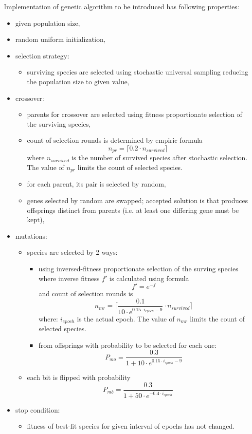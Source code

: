 \documentclass[a4paper]{IEEEtran}
\begin{document}
Implementation of genetic algorithm to be introduced has following properties:
\begin{itemize}
	\item given population size,
	\item random uniform initialization,
	\item selection strategy:
	\begin{itemize}
		\item surviving species are selected using stochastic universal 
		sampling reducing 
		the population size to given value,
	\end{itemize}
	\item crossover:
	\begin{itemize}
		\item parents for crossover are selected using fitness proportionate
		selection of the surviving species,
		\item count of selection rounds is determined by empiric formula
		\[ n_{pr} = \lceil 0.2\cdot n_{survived} \rceil \] 		
		where $ n_{survived} $ is the number of survived species after stochastic selection.
		The value of $ n_{pr} $ limits the count of selected species.
		\item for each parent, its pair is selected by random,
		\item genes selected by random are swapped; accepted solution is that 
		produces  offsprings distinct from parents (i.e. at least one differing gene must be
		kept),
	\end{itemize}
	\item mutations:
	\begin{itemize}
		\item species are selected by 2 ways:
		\begin{itemize}
			\item using inversed-fitness proportionate
			selection of the surving species where inverse fitness $ f' $ is 
			calculated using formula \[  f' = e^{-f} \]
			and count of selection rounds is
			\[ n_{mr} = \lceil \dfrac{0.1}{10\cdot e^{0.15\cdot i_{epoch} - 9}} 
			\cdot n_{survived} \rceil \]
			where: $ i_{epoch} $ is the actual epoch.
			The value of $ n_{mr} $ limits the count of selected species.
			\item from offsprings with probability to be selected for each one:
			\[ P_{mo} = \dfrac{0.3}{1+10\cdot e^{0.15\cdot i_{epoch} - 9}} \]
		\end{itemize}
		\item each bit is flipped with probability\\
		\[ P_{mb} = \dfrac{0.3}{1+50\cdot e^{-0.4\cdot i_{epoch}}} \]
	\end{itemize}
	\item stop condition:
	\begin{itemize}
		\item fitness of best-fit species for given interval of epochs has not changed.
	\end{itemize}
	
\end{itemize}
\end{document}
